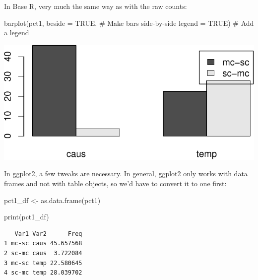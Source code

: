 \documentclass[
  11pt,
  letterpaper,
  DIV=11,
  numbers=noendperiod]{scrreprt}
\newenvironment{Shaded}{\begin{snugshade}}{\end{snugshade}}
\newcommand{\AttributeTok}[1]{\textcolor[rgb]{0.40,0.45,0.13}{#1}}
\newcommand{\CommentTok}[1]{\textcolor[rgb]{0.37,0.37,0.37}{#1}}
\newcommand{\ConstantTok}[1]{\textcolor[rgb]{0.56,0.35,0.01}{#1}}
\newcommand{\FunctionTok}[1]{\textcolor[rgb]{0.28,0.35,0.67}{#1}}
\newcommand{\NormalTok}[1]{\textcolor[rgb]{0.00,0.23,0.31}{#1}}
\newcommand{\OtherTok}[1]{\textcolor[rgb]{0.00,0.23,0.31}{#1}}
\begin{document}
\begin{tcolorbox}[enhanced jigsaw, toprule=.15mm, opacitybacktitle=0.6, coltitle=black, arc=.35mm, colback=white, title=\textcolor{quarto-callout-note-color}{\faInfo}\hspace{0.5em}{How do I plot percentages?}, titlerule=0mm, toptitle=1mm, bottomtitle=1mm, breakable, rightrule=.15mm, opacityback=0, bottomrule=.15mm, leftrule=.75mm, colframe=quarto-callout-note-color-frame, left=2mm, colbacktitle=quarto-callout-note-color!10!white]

In Base R, very much the same way as with the raw counts:

\begin{Shaded}
\begin{Highlighting}[]
\FunctionTok{barplot}\NormalTok{(pct1, }
        \AttributeTok{beside =} \ConstantTok{TRUE}\NormalTok{,  }\CommentTok{\# Make bars side{-}by{-}side}
        \AttributeTok{legend =} \ConstantTok{TRUE}\NormalTok{)  }\CommentTok{\# Add a legend}
\end{Highlighting}
\end{Shaded}

\includegraphics{Categorical_data_files/figure-pdf/unnamed-chunk-16-1.pdf}

In ggplot2, a few tweaks are necessary. In general, ggplot2 only works
with data frames and not with table objects, so we'd have to convert it
to one first:

\begin{Shaded}
\begin{Highlighting}[]
\NormalTok{pct1\_df }\OtherTok{\textless{}{-}} \FunctionTok{as.data.frame}\NormalTok{(pct1)}

\FunctionTok{print}\NormalTok{(pct1\_df)}
\end{Highlighting}
\end{Shaded}

\begin{verbatim}
   Var1 Var2      Freq
1 mc-sc caus 45.657568
2 sc-mc caus  3.722084
3 mc-sc temp 22.580645
4 sc-mc temp 28.039702
\end{verbatim}


\end{tcolorbox}
\end{document}
